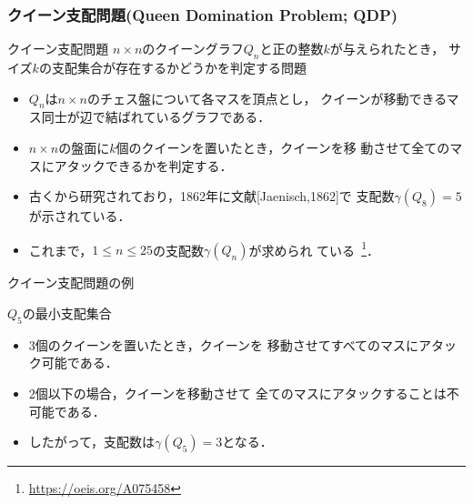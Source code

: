 \documentclass[dvipdfmx,10pt]{beamer}
\begin{document}
%
%
\begin{frame}\frametitle{クイーン支配問題(Queen Domination Problem; QDP)}

  \begin{alertblock}{クイーン支配問題}\centering
    $n\times n$のクイーングラフ$Q_n$と正の整数$k$が与えられたとき，
    サイズ$k$の支配集合が存在するかどうかを判定する問題
 \end{alertblock}
 \vfill
 \begin{itemize}
 \item $Q_n$は$n\times n$のチェス盤について各マスを頂点とし，
   クイーンが移動できるマス同士が辺で結ばれているグラフである．
 \item $n\times n$の盤面に$k$個のクイーンを置いたとき，クイーンを移
   動させて全てのマスにアタックできるかを判定する．
 \item 古くから研究されており，1862年に文献[Jaenisch,1862]で
   支配数$\gamma(Q_8)=5$が示されている．
 \item これまで，$1\leq n\leq 25$の支配数$\gamma(Q_n)$が求められ
   ている~\footnote{\url{https://oeis.org/A075458}}．
 \end{itemize}
\end{frame}
 
 
%
%

\begin{frame}{クイーン支配問題の例}
  \begin{exampleblock}{$Q_5$の最小支配集合}
  \begin{center}
   \scalebox{1.3}{
   
   }
  \end{center}
 \end{exampleblock}
 \vfill
 \begin{itemize}
  \item 3個のクイーンを置いたとき，クイーンを
	移動させてすべてのマスにアタック可能である．
  \item 2個以下の場合，クイーンを移動させて
	全てのマスにアタックすることは不可能である．
  \item したがって，支配数は$\gamma(Q_{5})=3$となる．
 \end{itemize}
\end{frame}



%
%
\end{document}
